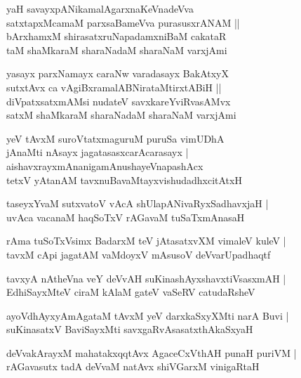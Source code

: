 \begin{shloka}
yaH savayxpANikamalAgarxnaKeVnadeVva\\
satxtapxMcamaM parxsaBameVva purasusxrANAM ||\\
bArxhamxM shirasatxruNapadamxniBaM cakataR \\
taM shaMkaraM sharaNadaM sharaNaM varxjAmi
\end{shloka}

\begin{shloka}
yasayx parxNamayx caraNw varadasayx BakAtxyX\\
sutxtAvx ca vAgiBxramalABNirataMtirxtABiH ||\\
diVpatxsatxmAMsi nudateV savxkareYviRvasAMvx\\
satxM shaMkaraM sharaNadaM sharaNaM varxjAmi
\end{shloka}

\begin{shloka}
yeV tAvxM suroVtatxmaguruM puruSa vimUDhA\\
jAnaMti nAsayx jagatasasxcarAcarasayx |\\
aishavxrayxmAnanigamAnushayeVnapashAcx\\
tetxV yAtanAM tavxnuBavaMtayxvishudadhxcitAtxH 
\end{shloka}

\begin{shloka}
taseyxYvaM sutxvatoV vAcA shUlapANivaRyxSadhavxjaH |\\
uvAca vacanaM haqSoTxV rAGavaM tuSaTxmAnasaH 
\end{shloka}

\begin{shloka}
rAma tuSoTxVsimx BadarxM teV jAtasatxvXM vimaleV kuleV |\\
tavxM cApi jagatAM vaMdoyxV mAsusoV deVvarUpadhaqtf
\end{shloka}

\begin{shloka}
tavxyA nAtheVna veY deVvAH suKinashAyxshavxtiVsasxmAH |\\
EdhiSayxMteV ciraM kAlaM gateV vaSeRV catudaRsheV 
\end{shloka}

\begin{shloka}
ayoVdhAyxyAmAgataM tAvxM yeV darxkaSxyXMti narA Buvi |\\
suKinasatxV BaviSayxMti savxgaRvAsasatxthAkaSxyaH 
\end{shloka}

\begin{shloka}
deVvakArayxM mahatakxqqtAvx AgaceCxVthAH punaH puriVM |\\
rAGavasutx tadA deVvaM natAvx shiVGarxM vinigaRtaH 
\end{shloka}


